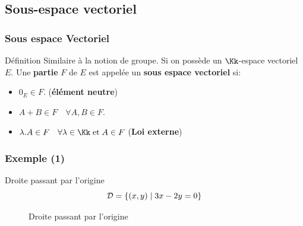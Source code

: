 \documentclass[dvipsnames]{beamer}
\begin{document}
\subsection{Sous-espace vectoriel}%
\label{sub:sous_espace_vectoriel}
\begin{frame}[<+->]
  \frametitle{Sous espace Vectoriel}

  \begin{block}{Définition}
    \small
    Similaire à la notion de groupe. Si on possède un $\Kk$-espace
    vectoriel $E$. Une \textbf{partie}  $F$ de $E$ est appelée un
    \textbf{\alert{sous espace vectoriel}} si:

      \begin{itemize}
        \item $0_E \in F$. (\textbf{élément neutre})\\[10pt]
        \item $A + B \in F\quad \forall A, B \in F$. \\[10pt]

        \item $\lambda.A\in F\quad \forall \lambda\in \Kk \;\text{et}\; A\in F$
          (\textbf{\alert{Loi externe}})
      \end{itemize}
  \end{block}
  
\end{frame}
\begin{frame}[t]
  \frametitle{Exemple (1)}

  \begin{block}{Droite passant par l'origine}
    \small
   \begin{equation*}
     \small
     \mathcal{D} = \left\{(x,y)\;|\; 3x - 2y = 0\right\}
   \end{equation*} 
  \end{block}
  \begin{figure}[htpb]
  \begin{center}
  \end{center}
  \caption{Droite passant par l'origine}%
  \label{fig:}
  \end{figure}
  
  
\end{frame}
\end{document}
